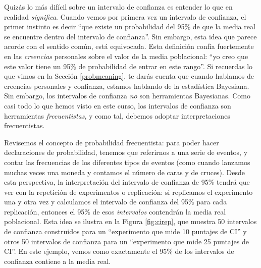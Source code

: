 \documentclass[spanish,]{book}
\begin{document}
Quizás lo más difícil sobre un intervalo de confianza es entender lo que
en realidad \emph{significa}. Cuando vemos por primera vez un intervalo
de confianza, el primer instinto es decir ``que existe un probabilidad
del 95\% de que la media real se encuentre dentro del intervalo de
confianza''. Sin embargo, esta idea que parece acorde con el sentido
común, está equivocada. Esta definición confía fuertemente en las
\emph{creencias} personales sobre el valor de la media poblacional: ``yo
creo que este valor tiene un 95\% de probabilidad de entrar en este
rango''. Si recuerdas lo que vimos en la Sección \ref{probmeaning}, te
darás cuenta que cuando hablamos de creencias personales y confianza,
estamos hablando de la estadística Bayesiana. Sin embargo, los
intervalos de confianza \emph{no} son herramientas Bayesianas. Como casi
todo lo que hemos visto en este curso, los intervalos de confianza son
herramientas \emph{frecuentistas}, y como tal, debemos adoptar
interpretaciones frecuentistas.

Revisemos el concepto de probabilidad frecuentista: para poder hacer
declaraciones de probabilidad, tenemos que referirnos a una serie de
eventos, y contar las frecuencias de los diferentes tipos de eventos
(como cuando lanzamos muchas veces una moneda y contamos el número de
caras y de cruces). Desde esta perspectiva, la interpretación del
intervalo de confianza de 95\% tendrá que ver con la repetición de
experimentos o replicación: si replicamos el experimento una y otra vez
y calculamos el intervalo de confianza del 95\% para cada replicación,
entonces el 95\% de esos \emph{intervalos} contendrán la media real
poblacional. Esta idea se ilustra en la Figura \ref{fig:cirep}, que
muestra 50 intervalos de confianza construidos para un ``experimento que
mide 10 puntajes de CI'' y otros 50 intervalos de confianza para un
``experimento que mide 25 puntajes de CI''. En este ejemplo, vemos como
exactamente el 95\% de los intervalos de confianza contiene a la media
real.
\end{document}
